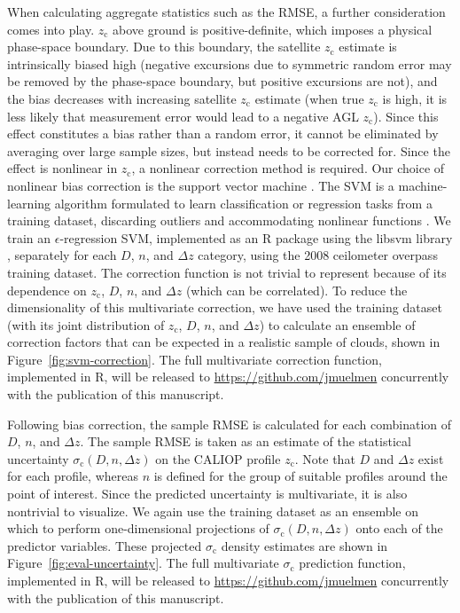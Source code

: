 \documentclass[essd,manuscript]{copernicus}\usepackage[]{graphicx}\usepackage[]{color}
\newcommand\CBHc{\ensuremath{z_\text{c}}}
\newcommand\sigmac{\ensuremath{\sigma_\text{c}}}
\begin{document}
When calculating aggregate statistics such as the RMSE, a further consideration
comes into play.  \CBHc{} above ground is positive-definite, which imposes a
physical phase-space boundary.  Due to this boundary, the satellite \CBHc{}
estimate is intrinsically biased high (negative excursions due to symmetric
random error may be removed by the phase-space boundary, but positive excursions
are not), and the bias decreases with increasing satellite \CBHc{} estimate
(when true \CBHc{} is high, it is less likely that measurement error would lead
to a negative AGL \CBHc{}).  Since this effect constitutes a bias rather than a
random error, it cannot be eliminated by averaging over large sample sizes, but
instead needs to be corrected for.  Since the effect is nonlinear in \CBHc{}, a
nonlinear correction method is required.  Our choice of nonlinear bias
correction is the support vector machine \citep[SVM;][]{Cortes1995}.  The SVM is
a machine-learning algorithm formulated to learn classification
\citep{Cortes1995} or regression \citep{Vapnik1995} tasks from a training
dataset, discarding outliers and accommodating nonlinear functions
\citep[e.g.,][]{Smola2004}.  We train an $\epsilon$-regression SVM, implemented
as an R package \citep{e1071} using the libsvm library \citep{svm}, separately
for each $D$, $n$, and $\Delta z$ category, using the 2008 ceilometer overpass
training dataset.  The correction function is not trivial to represent because
of its dependence on $z_\text{c}$, $D$, $n$, and $\Delta z$ (which can be
correlated).  To reduce the dimensionality of this multivariate correction, we
have used the training dataset (with its joint distribution of $z_\text{c}$,
$D$, $n$, and $\Delta z$) to calculate an ensemble of correction factors that
can be expected in a realistic sample of clouds, shown in
Figure~\ref{fig:svm-correction}.  The full multivariate correction function,
implemented in R, will be released to \url{https://github.com/jmuelmen}
concurrently with the publication of this manuscript.

Following bias correction, the sample RMSE is calculated for each combination of
$D$, $n$, and $\Delta z$.  The sample RMSE is taken as an estimate of the
statistical uncertainty $\sigmac(D,n,\Delta z)$ on the CALIOP profile \CBHc{}.
Note that $D$ and $\Delta z$ exist for each profile, whereas $n$ is defined for
the group of suitable profiles around the point of interest.  Since the
predicted uncertainty is multivariate, it is also nontrivial to visualize.  We
again use the training dataset as an ensemble on which to perform
one-dimensional projections of $\sigmac(D,n,\Delta z)$ onto each of the
predictor variables.  These projected $\sigmac$ density estimates are shown in
Figure~\ref{fig:eval-uncertainty}.  The full multivariate $\sigmac$ prediction
function, implemented in R, will be released to
\url{https://github.com/jmuelmen} concurrently with the publication of this
manuscript.
\end{document}
